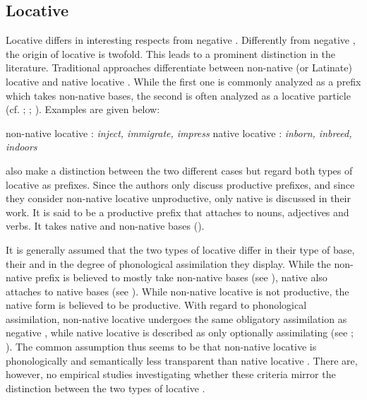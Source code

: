 \subsection{Locative } \label{locative in}

Locative  differs in interesting respects from negative . Differently from negative , the origin of locative  is twofold. This leads to a prominent distinction in the literature. Traditional approaches differentiate between non-native (or Latinate) locative  and native locative .  While the first one is commonly analyzed as a prefix which takes non-native bases, the second is often analyzed as a locative particle (cf. \citealt[497ff.]{Jespersen.1965}; \citealt[115,163f.]{Marchand.1969}; \citealt[1685]{Bauer.2002}). Examples are given below:

\begin{exe}
	\ex non-native locative : \hspace{0.7cm} \textit{inject, immigrate, impress}
	\ex native locative : \hspace{1.4cm} \textit{inborn, inbreed, indoors}
\end{exe}

\cite{Bauer.2013} also make a distinction between the two different cases but regard both types of locative  as prefixes. Since the authors only discuss productive prefixes, and since they consider non-native locative  unproductive,  only native  is discussed in their work. It is said to be a productive prefix that attaches to nouns, adjectives and verbs. It takes native and non-native bases (\citealt[334, 340]{Bauer.2013}).
 
 It is generally assumed that the two types of locative  differ in their type of base, their  and in the degree of phonological assimilation they display. While the non-native prefix is believed to mostly take non-native bases (see \citealt[499]{Jespersen.1965}), native  also attaches to native bases (see \citealt[334]{Bauer.2013}). While non-native locative  is not productive, the native form is believed to be productive. With regard to phonological assimilation, non-native locative  undergoes the same obligatory assimilation as negative , while native locative  is described as only optionally assimilating (see \citealt[499]{Jespersen.1965}; \citealt[335]{Bauer.2013}). The common assumption thus seems to be that non-native locative  is phonologically and semantically less transparent than native locative . There are, however, no empirical studies investigating whether these criteria mirror the distinction between the two types of locative . 
 

